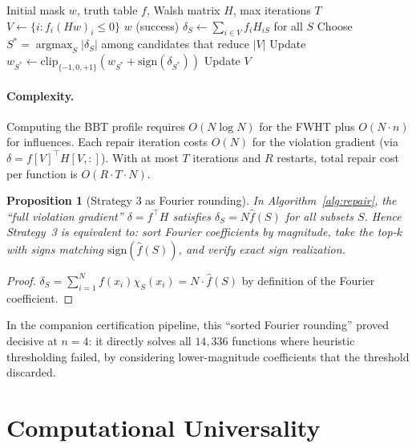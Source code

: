 \documentclass[11pt]{article}
\newtheorem{proposition}[theorem]{Proposition}
\newcommand{\sign}{\mathrm{sign}}
\DeclareMathOperator*{\argmax}{argmax}
\begin{document}
\begin{algorithm}[t]
\caption{\textsc{GreedyRepair}}
\label{alg:greedy}
\begin{algorithmic}[1]
\REQUIRE Initial mask $w$, truth table $f$, Walsh matrix $H$, max iterations $T$
\STATE $V \gets \{i : f_i (Hw)_i \le 0\}$ 
     \RETURN $w$ (success) \ENDIF
    \STATE $\delta_S \gets \sum_{i \in V} f_i H_{iS}$ for all $S$ 
    \STATE Choose $S^* = \argmax_S |\delta_S|$ among candidates that reduce $|V|$
    \STATE Update $w_{S^*} \gets \mathrm{clip}_{\{-1,0,+1\}}(w_{S^*} + \sign(\delta_{S^*}))$
    \STATE Update $V$
\ENDFOR
\end{algorithmic}
\end{algorithm}

\paragraph{Complexity.} Computing the BBT profile requires $O(N \log N)$ for the FWHT plus $O(N \cdot n)$ for influences. Each repair iteration costs $O(N)$ for the violation gradient (via $\delta = f[V]^\top H[V, :]$). With at most $T$ iterations and $R$ restarts, total repair cost per function is $O(R \cdot T \cdot N)$.

\begin{proposition}[Strategy 3 as Fourier rounding]
\label{prop:fourier_round}
In Algorithm~\ref{alg:repair}, the ``full violation gradient'' $\delta = f^\top H$ satisfies $\delta_S = N \hat{f}(S)$ for all subsets $S$. Hence Strategy~3 is equivalent to: sort Fourier coefficients by magnitude, take the top-$k$ with signs matching $\sign(\hat{f}(S))$, and verify exact sign realization.
\end{proposition}

\begin{proof}
$\delta_S = \sum_{i=1}^N f(x_i) \chi_S(x_i) = N \cdot \hat{f}(S)$ by definition of the Fourier coefficient.
\end{proof}

In the companion certification pipeline, this ``sorted Fourier rounding'' proved decisive at $n=4$: it directly solves all $14{,}336$ functions where heuristic thresholding failed, by considering lower-magnitude coefficients that the threshold discarded.


\section{Computational Universality}
\label{sec:universality}
\end{document}
